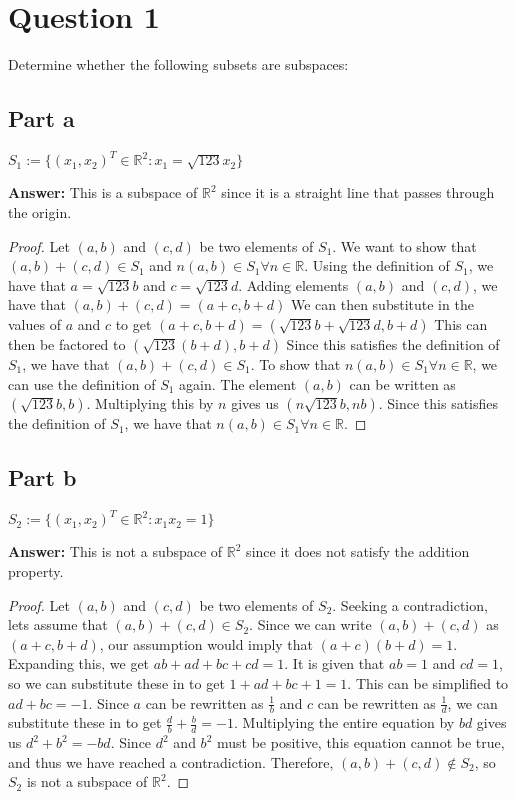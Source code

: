 \documentclass{article}
\begin{document}
\section*{Question 1}
Determine whether the following subsets are subspaces:

\subsection*{Part a}
$S_{1} := \{(x_{1},x_{2})^{T} \in \mathbb{R}^2 : x_{1} = \sqrt{123}x_{2}\}$

\textbf{Answer:} This is a subspace of $\mathbb{R}^2$ since it is a straight line that passes through the origin.

\begin{proof}
Let $(a,b)$ and $(c,d)$ be two elements of $S_{1}$.
We want to show that $(a,b) + (c,d) \in S_{1}$ and $n(a,b) \in S_{1} \forall n \in \mathbb{R}$.
Using the definition of $S_{1}$, we have that $a=\sqrt{123}b$ and $c=\sqrt{123}d$.
Adding elements $(a,b)$ and $(c,d)$, we have that $(a,b) + (c,d) = (a+c,b+d)$
We can then substitute in the values of $a$ and $c$ to get $(a+c,b+d) = (\sqrt{123}b+\sqrt{123}d,b+d)$
This can then be factored to $(\sqrt{123}(b+d),b+d)$
Since this satisfies the definition of $S_{1}$, we have that $(a,b) + (c,d) \in S_{1}$.
To show that $n(a,b) \in S_{1} \forall n \in \mathbb{R}$, we can use the definition of $S_{1}$ again.
The element $(a,b)$ can be written as $(\sqrt{123}b,b)$.
Multiplying this by $n$ gives us $(n\sqrt{123}b,nb)$.
Since this satisfies the definition of $S_{1}$, we have that $n(a,b) \in S_{1} \forall n \in \mathbb{R}$.
\end{proof}

\subsection*{Part b}
$S_{2} := \{(x_{1},x_{2})^{T} \in \mathbb{R}^2 : x_{1}x_{2} = 1\}$

\textbf{Answer:} This is not a subspace of $\mathbb{R}^2$ since it does not satisfy the addition property.

\begin{proof}
Let $(a,b)$ and $(c,d)$ be two elements of $S_{2}$.
Seeking a contradiction, lets assume that $(a,b) + (c,d) \in S_{2}$.
Since we can write $(a,b) + (c,d)$ as $(a+c,b+d)$, our assumption would imply that $(a+c)(b+d) = 1$.
Expanding this, we get $ab+ad+bc+cd = 1$.
It is given that $ab=1$ and $cd=1$, so we can substitute these in to get $1+ad+bc+1 = 1$.
This can be simplified to $ad+bc = -1$.
Since $a$ can be rewritten as $\frac{1}{b}$ and $c$ can be rewritten as $\frac{1}{d}$, we can substitute these in to get $\frac{d}{b}+\frac{b}{d} = -1$.
Multiplying the entire equation by $bd$ gives us $d^2+b^2 = -bd$.
Since $d^2$ and $b^2$ must be positive, this equation cannot be true, and thus we have reached a contradiction.
Therefore, $(a,b) + (c,d) \notin S_{2}$, so $S_{2}$ is not a subspace of $\mathbb{R}^2$.
\end{proof}
\end{document}
